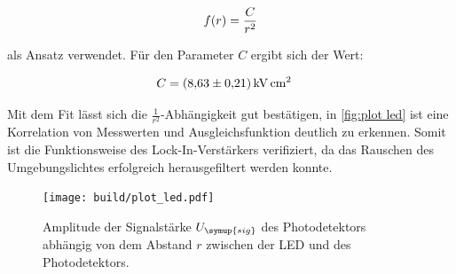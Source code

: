 \begin{equation}
  f(r)=\frac{C}{r^2} \notag
\end{equation}

als Ansatz verwendet.
Für den Parameter $C$ ergibt sich der Wert:

\begin{align}
  C &= \qty{8.63+-0.21}{\kilo\volt\square\centi\metre} \notag
\end{align}

Mit dem Fit lässt sich die $\frac{1}{r^2}$-Abhängigkeit gut bestätigen, in \autoref{fig:plot led} ist eine Korrelation
von Messwerten und Ausgleichsfunktion deutlich zu erkennen.
Somit ist die Funktionsweise des Lock-In-Verstärkers verifiziert, da das Rauschen des Umgebungslichtes erfolgreich herausgefiltert
werden konnte.

\begin{figure}
  \centering
  \texttt{[image: build/plot\_led.pdf]}
  \caption{Amplitude der Signalstärke $U_{\symup{sig}}$ des Photodetektors abhängig von dem Abstand $r$ zwischen der LED und des Photodetektors.}
  \label{fig:plot led}
\end{figure}
